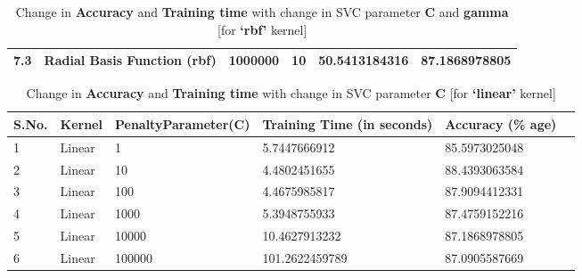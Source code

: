 \documentclass{report}
\begin{document}
\begin{table}[!h]
\begin{tabular}{|p{0.7cm}|p{4.1cm}|p{2.4cm}|p{2cm}|p{2.5cm}|p{2.5cm}|}
7.3            & Radial Basis Function (rbf) & 1000000                         & 10                                  & 50.5413184316                       & 87.1868978805              \\ \hline
\end{tabular}
\caption{Change in \textbf{Accuracy} and \textbf{Training time} with change in SVC parameter \textbf{C} and \textbf{gamma} [for \textbf{‘rbf’} kernel]}
\label{my-table}
\end{table}\hspace*{-1cm}
\hspace*{-4cm}
\vspace*{2cm}
\begin{table}[!h]
\centering
\begin{tabular}{|p{0.7cm}|p{4.1cm}|p{2.4cm}|p{2cm}|p{2.5cm}|p{2.5cm}|}
\hline
\textbf{S.No.} & \textbf{Kernel} & \textbf{Penalty\linebreak Parameter\linebreak (C)} & \textbf{Training Time (in seconds)} & \textbf{Accuracy \linebreak(\% age)} \\ \hline
1              & Linear          & 1                                & 5.7447666912                        & 85.5973025048              \\ \hline
2              & Linear          & 10                               & 4.4802451655                        & 88.4393063584              \\ \hline
3              & Linear          & 100                              & 4.4675985817                        & 87.9094412331              \\ \hline
4              & Linear          & 1000                             & 5.3948755933                        & 87.4759152216              \\ \hline
5              & Linear          & 10000                            & 10.4627913232                       & 87.1868978805              \\ \hline
6              & Linear          & 100000                           & 101.2622459789                      & 87.0905587669              \\ \hline
\end{tabular}
\caption{Change in \textbf{Accuracy} and \textbf{Training time} with change in SVC parameter \textbf{C}  [for \textbf{‘linear’} kernel]}
\label{my-table}
\end{table}
\pagebreak
\end{document}
